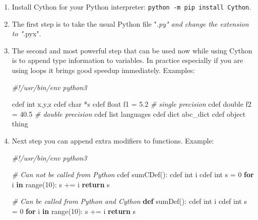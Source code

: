 \documentclass[
]{article}
\newenvironment{Shaded}{}{}
\newcommand{\BuiltInTok}[1]{#1}
\newcommand{\CommentTok}[1]{\textcolor[rgb]{0.38,0.63,0.69}{\textit{#1}}}
\newcommand{\ControlFlowTok}[1]{\textcolor[rgb]{0.00,0.44,0.13}{\textbf{#1}}}
\newcommand{\DecValTok}[1]{\textcolor[rgb]{0.25,0.63,0.44}{#1}}
\newcommand{\FloatTok}[1]{\textcolor[rgb]{0.25,0.63,0.44}{#1}}
\newcommand{\KeywordTok}[1]{\textcolor[rgb]{0.00,0.44,0.13}{\textbf{#1}}}
\newcommand{\NormalTok}[1]{#1}
\newcommand{\OperatorTok}[1]{\textcolor[rgb]{0.40,0.40,0.40}{#1}}
\begin{document}
\begin{enumerate}
\def\labelenumi{\arabic{enumi}.}
\item
  Install Cython for your Python interpreter:
  \texttt{python\ -m\ pip\ install\ Cython}.
\item
  The first step is to take the usual Python file "\emph{.py" and change
  the extension to "}.pyx".
\item
  The second and most powerful step that can be used now while using
  Cython is to append type information to variables. In practice
  especially if you are using loops it brings good speedup immediately.
  Examples:

\begin{Shaded}
\begin{Highlighting}[]
\CommentTok{\#!/usr/bin/env python3}

\NormalTok{cdef }\BuiltInTok{int}\NormalTok{ x,y,z}
\NormalTok{cdef char }\OperatorTok{*}\NormalTok{s}
\NormalTok{cdef }\BuiltInTok{float}\NormalTok{ f1 }\OperatorTok{=} \FloatTok{5.2}    \CommentTok{\# single precision}
\NormalTok{cdef double f2 }\OperatorTok{=} \FloatTok{40.5}  \CommentTok{\# double precision}
\NormalTok{cdef }\BuiltInTok{list}\NormalTok{ languages}
\NormalTok{cdef }\BuiltInTok{dict}\NormalTok{ abc\_dict}
\NormalTok{cdef }\BuiltInTok{object}\NormalTok{ thing}
\end{Highlighting}
\end{Shaded}
\item
  Next step you can append extra modifiers to functions. Example:

\begin{Shaded}
\begin{Highlighting}[]
\CommentTok{\#!/usr/bin/env python3}

\CommentTok{\# Can not be called from Python}
\NormalTok{cdef sumCDef(): }
\NormalTok{  cdef }\BuiltInTok{int}\NormalTok{ i}
\NormalTok{  cdef }\BuiltInTok{int}\NormalTok{ s }\OperatorTok{=} \DecValTok{0}
  \ControlFlowTok{for}\NormalTok{ i }\KeywordTok{in} \BuiltInTok{range}\NormalTok{(}\DecValTok{10}\NormalTok{):}
\NormalTok{    s }\OperatorTok{+=}\NormalTok{ i}
  \ControlFlowTok{return}\NormalTok{ s}

\CommentTok{\# Can be called from Python and Cython}
\KeywordTok{def}\NormalTok{ sumDef(): }
\NormalTok{  cdef }\BuiltInTok{int}\NormalTok{ i}
\NormalTok{  cdef }\BuiltInTok{int}\NormalTok{ s }\OperatorTok{=} \DecValTok{0}
  \ControlFlowTok{for}\NormalTok{ i }\KeywordTok{in} \BuiltInTok{range}\NormalTok{(}\DecValTok{10}\NormalTok{):}
\NormalTok{    s }\OperatorTok{+=}\NormalTok{ i}
  \ControlFlowTok{return}\NormalTok{ s}


\end{Highlighting}
\end{Shaded}
\end{enumerate}
\end{document}
